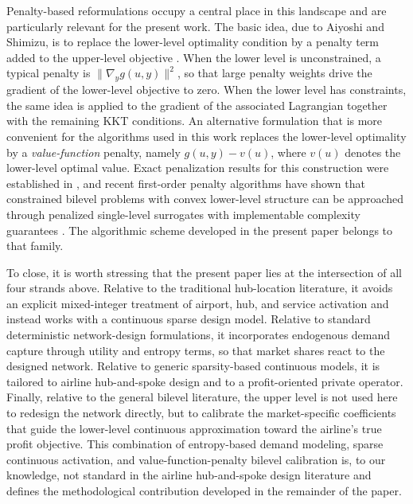 Penalty-based reformulations occupy a central place in this landscape and are particularly relevant for the present work. The basic idea, due to Aiyoshi and Shimizu, is to replace the lower-level optimality condition by a penalty term added to the upper-level objective \cite{AiyoshiShimizu1981,AiyoshiShimizu1984}. When the lower level is unconstrained, a typical penalty is $\|\nabla_y g(u,y)\|^2$, so that large penalty weights drive the gradient of the lower-level objective to zero. When the lower level has constraints, the same idea is applied to the gradient of the associated Lagrangian together with the remaining KKT conditions. An alternative formulation that is more convenient for the algorithms used in this work replaces the lower-level optimality by a \emph{value-function} penalty, namely $g(u,y)-v(u)$, where $v(u)$ denotes the lower-level optimal value. Exact penalization results for this construction were established in \cite{Ye1997Exact}, and recent first-order penalty algorithms have shown that constrained bilevel problems with convex lower-level structure can be approached through penalized single-level surrogates with implementable complexity guarantees \cite{LuMei2024,Jiang2024Primal}. The algorithmic scheme developed in the present paper belongs to that family.

To close, it is worth stressing that the present paper lies at the intersection of all four strands above. Relative to the traditional hub-location literature, it avoids an explicit mixed-integer treatment of airport, hub, and service activation and instead works with a continuous sparse design model. Relative to standard deterministic network-design formulations, it incorporates endogenous demand capture through utility and entropy terms, so that market shares react to the designed network. Relative to generic sparsity-based continuous models, it is tailored to airline hub-and-spoke design and to a profit-oriented private operator. Finally, relative to the general bilevel literature, the upper level is not used here to redesign the network directly, but to calibrate the market-specific coefficients that guide the lower-level continuous approximation toward the airline's true profit objective. This combination of entropy-based demand modeling, sparse continuous activation, and value-function-penalty bilevel calibration is, to our knowledge, not standard in the airline hub-and-spoke design literature and defines the methodological contribution developed in the remainder of the paper.
